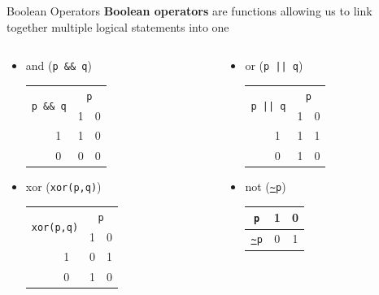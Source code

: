 {}\documentclass[letterpaper,
compress,
xcolor=x11names,
]{beamer}
\begin{document}
\begin{frame}{Boolean Operators}
	\footnotesize
	\textbf{Boolean operators} are functions allowing us to link together multiple logical statements into one
	\begin{columns}
		\begin{column}{0.5\linewidth}
			\begin{itemize}
				\item<2-> and (\texttt{p \&\& q}) \\
				\begin{tabular}{c  c || c | c }
					\multicolumn{2}{c}{\multirow{2}{*}{\texttt{p \&\& q}}} & \multicolumn{2}{c}{\texttt{p}} \\
					& & 1 & 0 \\
					\hhline{~=||=|=}
					\multirow{2}{*}{\texttt{q}} & 1 & 1 & 0 \\
					\cline{2-4}
					 & 0 & 0 & 0 \\
				\end{tabular}
				\vspace{0.5cm}
				\item<4-> xor (\texttt{xor(p,q)})
				\begin{tabular}{c  c || c | c }
					\multicolumn{2}{c}{\multirow{2}{*}{\texttt{xor(p,q)}}} & \multicolumn{2}{c}{\texttt{p}} \\
					& & 1 & 0 \\
					\hhline{~=||=|=}
					\multirow{2}{*}{\texttt{q}} & 1 & 0 & 1 \\
					\cline{2-4}
					& 0 & 1 & 0 \\
				\end{tabular}	
			\end{itemize}
		\end{column}
		\begin{column}{0.5\linewidth}
			\begin{itemize}
				\item<3-> or (\texttt{p || q}) \\
				\begin{tabular}{c  c || c | c }
					\multicolumn{2}{c}{\multirow{2}{*}{\texttt{p || q}}} & \multicolumn{2}{c}{\texttt{p}} \\
					& & 1 & 0 \\
					\hhline{~=||=|=}
					\multirow{2}{*}{\texttt{q}} & 1 & 1 & 1 \\
					\cline{2-4}
					& 0 & 1 & 0 \\
				\end{tabular}
				\vspace{0.5cm}
				\item<5-> not (\texttt{\url{~}p}) \\
				\vspace{0.5cm}
				\begin{tabular}{ c || c | c }
					\texttt{p} & 1 & 0 \\
					\hline
					\texttt{\url{~}p} & 0 & 1 \\
				\end{tabular}
				\vspace{0.25cm}
			\end{itemize}
		\end{column}
	\end{columns}
\end{frame}
\end{document}
